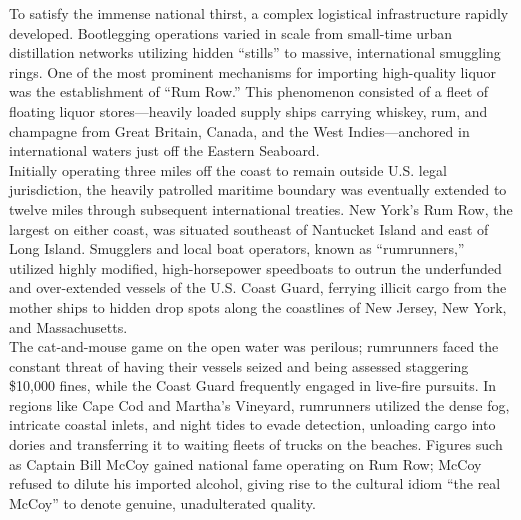 \documentclass[
]{article}
\begin{document}
To satisfy the immense national thirst, a complex logistical
infrastructure rapidly developed. Bootlegging operations varied in scale
from small-time urban distillation networks utilizing hidden ``stills''
to massive, international smuggling rings. One of the most prominent
mechanisms for importing high-quality liquor was the establishment of
``Rum Row.'' This phenomenon consisted of a fleet of floating liquor
stores---heavily loaded supply ships carrying whiskey, rum, and
champagne from Great Britain, Canada, and the West Indies---anchored in
international waters just off the Eastern Seaboard.\\
Initially operating three miles off the coast to remain outside U.S.
legal jurisdiction, the heavily patrolled maritime boundary was
eventually extended to twelve miles through subsequent international
treaties. New York's Rum Row, the largest on either coast, was situated
southeast of Nantucket Island and east of Long Island. Smugglers and
local boat operators, known as ``rumrunners,'' utilized highly modified,
high-horsepower speedboats to outrun the underfunded and over-extended
vessels of the U.S. Coast Guard, ferrying illicit cargo from the mother
ships to hidden drop spots along the coastlines of New Jersey, New York,
and Massachusetts.\\
The cat-and-mouse game on the open water was perilous; rumrunners faced
the constant threat of having their vessels seized and being assessed
staggering \$10,000 fines, while the Coast Guard frequently engaged in
live-fire pursuits. In regions like Cape Cod and Martha's Vineyard,
rumrunners utilized the dense fog, intricate coastal inlets, and night
tides to evade detection, unloading cargo into dories and transferring
it to waiting fleets of trucks on the beaches. Figures such as Captain
Bill McCoy gained national fame operating on Rum Row; McCoy refused to
dilute his imported alcohol, giving rise to the cultural idiom ``the
real McCoy'' to denote genuine, unadulterated quality.
\end{document}
